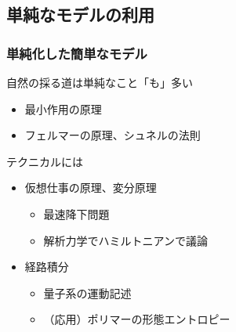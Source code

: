 \documentclass[10pt, dvipdfmx]{beamer}
\begin{document}
\subsection{単純なモデルの利用}
\begin{frame}\frametitle{単純化した簡単なモデル}

\large
\begin{alertblock}{自然の採る道は単純なこと「も」多い}
\begin{itemize}
	\item
	最小作用の原理
	\item
	フェルマーの原理、シュネルの法則
\end{itemize}
\end{alertblock}
\pause
\begin{exampleblock}{テクニカルには}
\begin{itemize}
		\item
		仮想仕事の原理、変分原理
			\begin{itemize}
			\large
			\item
			最速降下問題
			\item
			解析力学でハミルトニアンで議論
			\end{itemize}
		\item
		経路積分
			\begin{itemize}
			\large
			\item
			量子系の運動記述
			\item
			（応用）ポリマーの形態エントロピー
			\end{itemize}
\end{itemize}
\end{exampleblock}
\end{frame}
\end{document}
